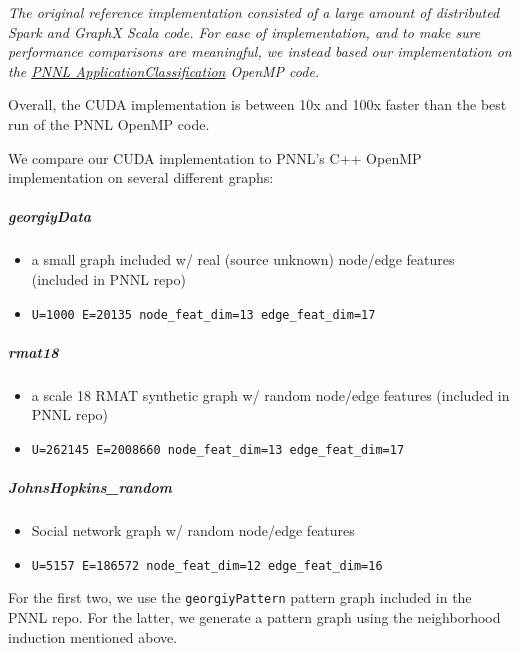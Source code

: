 \documentclass[10pt,oneside]{memoir}
\providecommand{\tightlist}{%
  \setlength{\itemsep}{0pt}\setlength{\parskip}{0pt}}
\let\oldsubparagraph\subparagraph
\renewcommand{\subparagraph}[1]{\oldsubparagraph{#1}\mbox{}}
\begin{document}
\emph{The original reference implementation consisted of a large amount
of distributed Spark and GraphX Scala code. For ease of implementation,
and to make sure performance comparisons are meaningful, we instead
based our implementation on the
\href{https://gitlab.hiveprogram.com/pnnl/ApplicationClassification}{PNNL
ApplicationClassification} OpenMP code.}

Overall, the CUDA implementation is between 10x and 100x faster than the
best run of the PNNL OpenMP code.

We compare our CUDA implementation to PNNL's C++ OpenMP implementation
on several different graphs:

\hypertarget{georgiydata}{%
\subparagraph{georgiyData}\label{georgiydata}}

\begin{itemize}
\tightlist
\item
  a small graph included w/ real (source unknown) node/edge features
  (included in PNNL repo)
\item
  \texttt{\textbar{}U\textbar{}=1000\ \textbar{}E\textbar{}=20135\ node\_feat\_dim=13\ edge\_feat\_dim=17}
\end{itemize}

\hypertarget{rmat18}{%
\subparagraph{rmat18}\label{rmat18}}

\begin{itemize}
\tightlist
\item
  a scale 18 RMAT synthetic graph w/ random node/edge features (included
  in PNNL repo)
\item
  \texttt{\textbar{}U\textbar{}=262145\ \textbar{}E\textbar{}=2008660\ node\_feat\_dim=13\ edge\_feat\_dim=17}
\end{itemize}

\hypertarget{johnshopkins_random}{%
\subparagraph{JohnsHopkins\_random}\label{johnshopkins_random}}

\begin{itemize}
\tightlist
\item
  Social network graph w/ random node/edge features
\item
  \texttt{\textbar{}U\textbar{}=5157\ \textbar{}E\textbar{}=186572\ node\_feat\_dim=12\ edge\_feat\_dim=16}
\end{itemize}

For the first two, we use the \texttt{georgiyPattern} pattern graph
included in the PNNL repo. For the latter, we generate a pattern graph
using the neighborhood induction mentioned above.
\end{document}
